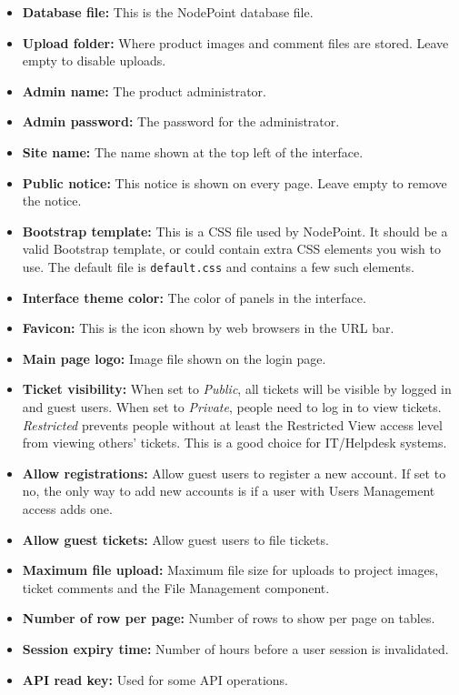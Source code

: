 \documentclass[11pt]{article}
\begin{document}
\begin{itemize}
\item \textbf{Database file:} This is the NodePoint database file.
\item \textbf{Upload folder:} Where product images and comment files are stored. Leave empty to disable uploads.
\item \textbf{Admin name:} The product administrator.
\item \textbf{Admin password:} The password for the administrator.
\item \textbf{Site name:} The name shown at the top left of the interface.
\item \textbf{Public notice:} This notice is shown on every page. Leave empty to remove the notice.
\item \textbf{Bootstrap template:} This is a CSS file used by NodePoint. It should be a valid Bootstrap template, or could contain extra CSS elements you wish to use. The default file is \texttt{default.css} and contains a few such elements.
\item \textbf{Interface theme color:} The color of panels in the interface.
\item \textbf{Favicon:} This is the icon shown by web browsers in the URL bar.
\item \textbf{Main page logo:} Image file shown on the login page.
\item \textbf{Ticket visibility:} When set to \textit{Public}, all tickets will be visible by logged in and guest users. When set to \textit{Private}, people need to log in to view tickets. \textit{Restricted} prevents people without at least the Restricted View access level from viewing others' tickets. This is a good choice for IT/Helpdesk systems.
\item \textbf{Allow registrations:} Allow guest users to register a new account. If set to no, the only way to add new accounts is if a user with Users Management access adds one.
\item \textbf{Allow guest tickets:} Allow guest users to file tickets.
\item \textbf{Maximum file upload:} Maximum file size for uploads to project images, ticket comments and the File Management component.
\item \textbf{Number of row per page:} Number of rows to show per page on tables.
\item \textbf{Session expiry time:} Number of hours before a user session is invalidated.
\item \textbf{API read key:} Used for some API operations.

\end{itemize}
\end{document}

